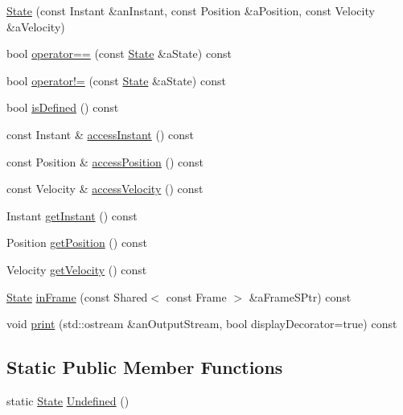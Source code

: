 \begin{DoxyCompactItemize}
\item 
\hyperlink{classostk_1_1astro_1_1trajectory_1_1_state_a8628aceae903c9492f0fb269888434b0}{State} (const Instant \&an\+Instant, const Position \&a\+Position, const Velocity \&a\+Velocity)
\item 
bool \hyperlink{classostk_1_1astro_1_1trajectory_1_1_state_acd68798b63a7e3a89e61b4b668d8dbb0}{operator==} (const \hyperlink{classostk_1_1astro_1_1trajectory_1_1_state}{State} \&a\+State) const
\item 
bool \hyperlink{classostk_1_1astro_1_1trajectory_1_1_state_a53ac2b13092bc7777efa14362fec4c46}{operator!=} (const \hyperlink{classostk_1_1astro_1_1trajectory_1_1_state}{State} \&a\+State) const
\item 
bool \hyperlink{classostk_1_1astro_1_1trajectory_1_1_state_a09966efb00e3206cc2d20935c55658ad}{is\+Defined} () const
\item 
const Instant \& \hyperlink{classostk_1_1astro_1_1trajectory_1_1_state_afc21870411eef52ce1293e31eda16d3c}{access\+Instant} () const
\item 
const Position \& \hyperlink{classostk_1_1astro_1_1trajectory_1_1_state_a711322a78c02f981d11ebec2ca0a0cd4}{access\+Position} () const
\item 
const Velocity \& \hyperlink{classostk_1_1astro_1_1trajectory_1_1_state_a7f6d626b9d5f045e026cd1ff2ea33200}{access\+Velocity} () const
\item 
Instant \hyperlink{classostk_1_1astro_1_1trajectory_1_1_state_af1ba3040b895b0963d5fb96a0756cc2b}{get\+Instant} () const
\item 
Position \hyperlink{classostk_1_1astro_1_1trajectory_1_1_state_ad5ceac322a929f0f62214a663a21f4ae}{get\+Position} () const
\item 
Velocity \hyperlink{classostk_1_1astro_1_1trajectory_1_1_state_a1a992dcad42fb3094766907a9472e7e0}{get\+Velocity} () const
\item 
\hyperlink{classostk_1_1astro_1_1trajectory_1_1_state}{State} \hyperlink{classostk_1_1astro_1_1trajectory_1_1_state_aa9c95303df830f9dfed347231961dcf6}{in\+Frame} (const Shared$<$ const Frame $>$ \&a\+Frame\+S\+Ptr) const
\item 
void \hyperlink{classostk_1_1astro_1_1trajectory_1_1_state_a0072b543bbac1abe5e94609c74491b5d}{print} (std\+::ostream \&an\+Output\+Stream, bool display\+Decorator=true) const
\end{DoxyCompactItemize}
\subsection*{Static Public Member Functions}
\begin{DoxyCompactItemize}
\item 
static \hyperlink{classostk_1_1astro_1_1trajectory_1_1_state}{State} \hyperlink{classostk_1_1astro_1_1trajectory_1_1_state_ab6ed6a252eeac1d24cf3b5c65ec0c6b6}{Undefined} ()
\end{DoxyCompactItemize}
